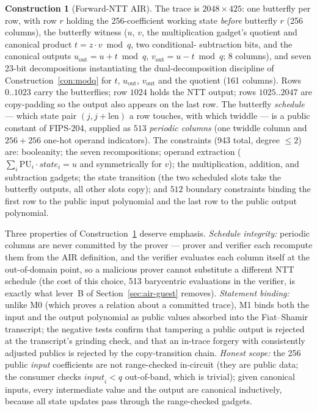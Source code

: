 \documentclass[11pt]{article}
\theoremstyle{plain}
\theoremstyle{definition}
\newtheorem{construction}[theorem]{Construction}
\theoremstyle{remark}
\begin{document}
\begin{construction}[Forward-NTT AIR]
\label{con:nttair}
The trace is $2048 \times 425$: one butterfly per row, with row $r$ holding
the 256-coefficient working state \emph{before} butterfly $r$ (256
columns), the butterfly witness ($u$, $v$, the multiplication gadget's
quotient and canonical product $t = z \cdot v \bmod q$, two conditional-%
subtraction bits, and the canonical outputs $u_{\mathrm{out}} = u + t
\bmod q$, $v_{\mathrm{out}} = u - t \bmod q$; 8 columns), and seven 23-bit
decompositions instantiating the dual-decomposition discipline of
Construction~\ref{con:modq} for $t$, $u_{\mathrm{out}}$,
$v_{\mathrm{out}}$ and the quotient (161 columns). Rows $0..1023$ carry the
butterflies; row $1024$ holds the NTT output; rows $1025..2047$ are
copy-padding so the output also appears on the last row. The butterfly
\emph{schedule} --- which state pair $(j, j{+}\mathrm{len})$ a row touches,
with which twiddle --- is a public constant of FIPS-204, supplied as $513$
\emph{periodic columns} (one twiddle column and $256 + 256$ one-hot operand
indicators). The constraints (943 total, degree $\le 2$) are: booleanity;
the seven recompositions; operand extraction
($\sum_i \mathrm{PU}_i \cdot \mathit{state}_i = u$ and symmetrically for
$v$); the multiplication, addition, and subtraction gadgets; the state
transition (the two scheduled slots take the butterfly outputs, all other
slots copy); and $512$ boundary constraints binding the first row to the
public input polynomial and the last row to the public output polynomial.
\end{construction}

Three properties of Construction~\ref{con:nttair} deserve emphasis.
\emph{Schedule integrity:} periodic
columns are never committed by the prover --- prover and verifier each
recompute them from the AIR definition, and the verifier evaluates each
column itself at the out-of-domain point, so a malicious prover cannot
substitute a different NTT schedule (the cost of this choice, 513
barycentric evaluations in the verifier, is exactly what lever~B of
Section~\ref{sec:air-guest} removes). \emph{Statement binding:} unlike M0
(which proves a relation about a committed trace), M1 binds both the input
and the output polynomial as public values absorbed into the Fiat--Shamir
transcript; the negative tests confirm that tampering a public output is
rejected at the transcript's grinding check, and that an in-trace forgery
with consistently adjusted publics is rejected by the copy-transition
chain. \emph{Honest scope:} the 256 public \emph{input} coefficients are
not range-checked in-circuit (they are public data; the consumer checks
$\mathit{input}_i < q$ out-of-band, which is trivial); given canonical
inputs, every intermediate value and the output are canonical inductively,
because all state updates pass through the range-checked gadgets.
\end{document}
